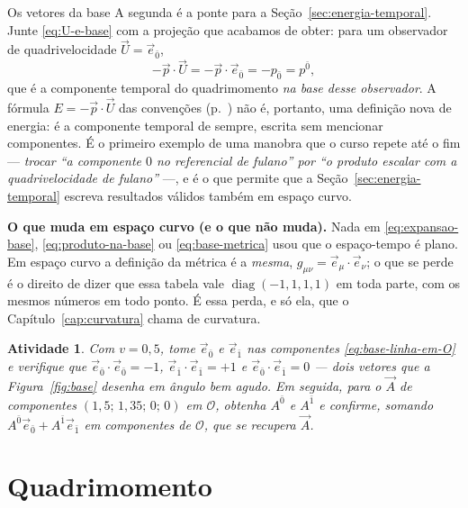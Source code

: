\documentclass[12pt,a4paper,oneside]{book}
\theoremstyle{rgplain}
\newtheorem{activity}{Atividade}[chapter]
\theoremstyle{rgremark}
\newcommand{\obs}{\mathcal{O}}
\begin{document}
\begin{interludio}{Os vetores da base}
A segunda é a ponte para a Seção~\ref{sec:energia-temporal}. Junte \eqref{eq:U-e-base} com a
projeção que acabamos de obter: para um observador de quadrivelocidade
$\vec U=\vec e_{\bar 0}$,
\[
  -\vec p\cdot\vec U=-\vec p\cdot\vec e_{\bar 0}=-p_{\bar 0}=p^{\bar 0} ,
\]
que é a componente temporal do quadrimomento \emph{na base desse observador}.
A fórmula $E=-\vec p\cdot\vec U$ das convenções (p.~\pageref{sec:convencoes})
não é, portanto, uma definição nova de energia: é a componente temporal de
sempre, escrita sem mencionar componentes. É o primeiro exemplo de uma
manobra que o curso repete até o fim --- \emph{trocar ``a componente $0$ no
referencial de fulano'' por ``o produto escalar com a quadrivelocidade de
fulano''} ---, e é o que permite que a Seção~\ref{sec:energia-temporal}
escreva resultados válidos também em espaço curvo.

\textbf{O que muda em espaço curvo (e o que não muda).} Nada em
\eqref{eq:expansao-base}, \eqref{eq:produto-na-base} ou
\eqref{eq:base-metrica} usou que o espaço-tempo é plano. Em espaço curvo a
definição da métrica é a \emph{mesma},
$g_{\mu\nu}=\vec e_\mu\cdot\vec e_\nu$; o que se perde é o direito de dizer que
essa tabela vale $\operatorname{diag}(-1,1,1,1)$ em toda parte, com os mesmos
números em todo ponto. É essa perda, e só ela, que o Capítulo~\ref{cap:curvatura}
chama de curvatura.

\begin{activity}
Com $v=0{,}5$, tome $\vec e_{\bar 0}$ e $\vec e_{\bar 1}$ nas componentes
\eqref{eq:base-linha-em-O} e verifique que
$\vec e_{\bar 0}\cdot\vec e_{\bar 0}=-1$, $\vec e_{\bar 1}\cdot\vec e_{\bar 1}=+1$ e
$\vec e_{\bar 0}\cdot\vec e_{\bar 1}=0$ --- dois vetores que a Figura~\ref{fig:base}
desenha em ângulo bem agudo. Em seguida, para o $\vec A$ de componentes
$(1{,}5;\,1{,}35;\,0;\,0)$ em $\obs$, obtenha $A^{\bar 0}$ e $A^{\bar 1}$ e
confirme, somando $A^{\bar 0}\vec e_{\bar 0}+A^{\bar 1}\vec e_{\bar 1}$ em componentes de
$\obs$, que se recupera $\vec A$.
\end{activity}

\end{interludio}

\section{Quadrimomento}
\label{sec:quadrimomento}
\end{document}
